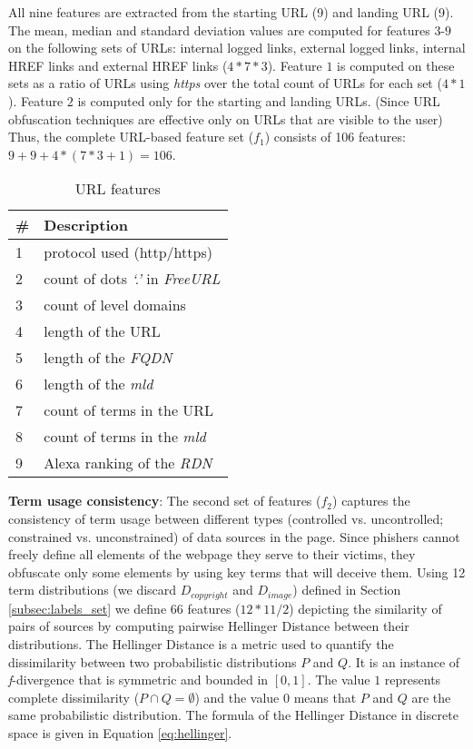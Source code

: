 \documentclass[10pt,conference,compsocconf,letterpaper]{IEEEtran}
\begin{document}
All nine features are extracted from the starting URL (9) and landing URL (9). The mean, median and standard deviation values are computed for features $3$-$9$ on the following sets of URLs: internal logged links, external logged links, internal HREF links and external HREF links ($4*7*3$). Feature $1$ is computed on these sets as a ratio of URLs using \textit{https} over the total count of URLs for each set ($4*1$). Feature $2$ is computed only for the starting and landing URLs.
\iffullversion
(Since URL obfuscation techniques are effective only on URLs that are visible to the user)
\fi
Thus, the complete URL-based feature set ($f_1$) consists of 106 features: $9+9+ 4* (7*3 + 1) = 106$.

\begin{table}[tbh]
\caption{URL features} \centering
\begin{tabular}{l l}

\# & \textbf{Description} \\ \hline
1 & protocol used (http/https) \\
2 & count of dots \textit{`.'} in \textit{FreeURL} \\
3 & count of level domains \\
4 & length of the URL \\
5 & length of the \textit{FQDN} \\
6 & length of the \textit{mld} \\
7 & count of terms in the URL \\
8 & count of terms in the \textit{mld} \\
9 & Alexa ranking of the \textit{RDN}

\end{tabular}
\label{tab:url_features}
\end{table}

\noindent\textbf{Term usage consistency}: The second set of features ($f_2$) captures the consistency of term usage between different types (controlled vs. uncontrolled; constrained vs. unconstrained) of data sources in the page. 
\iffullversion
Since phishers cannot freely define all elements of the webpage they serve to their victims, they obfuscate only some elements by using key terms that will deceive them. 
\fi
Using 12 term distributions (we discard $D_{copyright}$ and $D_{image}$) defined in Section \ref{subsec:labels_set} we define 66 features ($12*11/2$) depicting the similarity of pairs of sources by computing pairwise Hellinger Distance between their distributions.
The Hellinger Distance \cite{cam:2000:asymptotics} is a metric used to quantify the dissimilarity between two probabilistic distributions $P$ and $Q$. It is an instance of \textit{f}-divergence that is symmetric and bounded in $\left[ 0,1 \right] $. The value $1$ represents complete dissimilarity ($P \cap Q = \emptyset$) and the value $0$ means that  $P$ and $Q$ are the same probabilistic distribution. 
\iffeateval
The formula of the Hellinger Distance in discrete space is given in Equation \eqref{eq:hellinger}.
\end{document}
